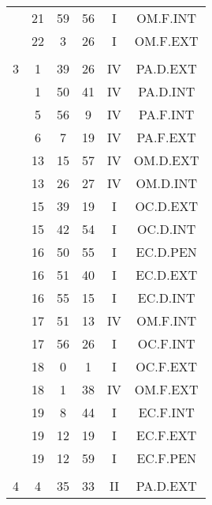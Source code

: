 \documentclass[12pt, a4paper]{article}
\begin{document}
\begin{multicols}{3}
{\begin{tabular}{c c c c c c}
	 	 	 	 & 21 & 59 & 56 & I & OM.F.INT\\%
	 	 	 	 & 22 & 3 & 26 & I & OM.F.EXT\\%
	 	 	 	 & & & & & \\%
	 	 	 	3 & 1 & 39 & 26 & IV & PA.D.EXT\\%
	 	 	 	 & 1 & 50 & 41 & IV & PA.D.INT\\%
	 	 	 	 & 5 & 56 & 9 & IV & PA.F.INT\\%
	 	 	 	 & 6 & 7 & 19 & IV & PA.F.EXT\\%
	 	 	 	 & 13 & 15 & 57 & IV & OM.D.EXT\\%
	 	 	 	 & 13 & 26 & 27 & IV & OM.D.INT\\%
	 	 	 	 & 15 & 39 & 19 & I & OC.D.EXT\\%
	 	 	 	 & 15 & 42 & 54 & I & OC.D.INT\\%
	 	 	 	 & 16 & 50 & 55 & I & EC.D.PEN\\%
	 	 	 	 & 16 & 51 & 40 & I & EC.D.EXT\\%
	 	 	 	 & 16 & 55 & 15 & I & EC.D.INT\\%
	 	 	 	 & 17 & 51 & 13 & IV & OM.F.INT\\%
	 	 	 	 & 17 & 56 & 26 & I & OC.F.INT\\%
	 	 	 	 & 18 & 0 & 1 & I & OC.F.EXT\\%
	 	 	 	 & 18 & 1 & 38 & IV & OM.F.EXT\\%
	 	 	 	 & 19 & 8 & 44 & I & EC.F.INT\\%
	 	 	 	 & 19 & 12 & 19 & I & EC.F.EXT\\%
	 	 	 	 & 19 & 12 & 59 & I & EC.F.PEN\\%
	 	 	 	 & & & & & \\%
	 	 	 	4 & 4 & 35 & 33 & II & PA.D.EXT\\%

\end{tabular}}
\end{multicols}
\end{document}
